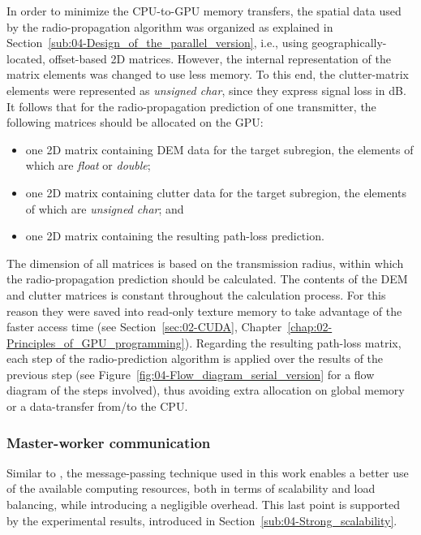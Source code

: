 In order to minimize the CPU-to-GPU memory transfers, the spatial
data used by the radio-propagation algorithm was organized as explained
in Section~\ref{sub:04-Design_of_the_parallel_version}, i.e., using
geographically-located, offset-based 2D matrices. However, the internal
representation of the matrix elements was changed to use less memory.
To this end, the clutter-matrix elements were represented as \emph{unsigned
char}, since they express signal loss in dB. It follows that for the
radio-propagation prediction of one transmitter, the following matrices
should be allocated on the GPU:
\begin{itemize}
\item one 2D matrix containing DEM data for the target subregion, the elements
of which are \emph{float} or \emph{double}; 
\item one 2D matrix containing clutter data for the target subregion, the
elements of which are \emph{unsigned char}; and
\item one 2D matrix containing the resulting path-loss prediction.
\end{itemize}
The dimension of all matrices is based on the transmission radius,
within which the radio-propagation prediction should be calculated.
The contents of the DEM and clutter matrices is constant throughout
the calculation process. For this reason they were saved into read-only
texture memory to take advantage of the faster access time (see Section~\ref{sec:02-CUDA},
Chapter~\ref{chap:02-Principles_of_GPU_programming}). Regarding
the resulting path-loss matrix, each step of the radio-prediction
algorithm is applied over the results of the previous step (see Figure~\ref{fig:04-Flow_diagram_serial_version}
for a flow diagram of the steps involved), thus avoiding extra allocation
on global memory or a data-transfer from/to the CPU.


\subsubsection{Master-worker communication}

Similar to \cite{Tabik-High_performance_three_horizon_composition_algorithm_for_large_scale_terrains:2011,Tabik-Optimal_tilt_and_orientation_maps_a_multi_algorithm_approach_for_heterogeneous_multicore_GPU_systems:2013},
the message-passing technique used in this work enables a better use
of the available computing resources, both in terms of scalability
and load balancing, while introducing a negligible overhead. This
last point is supported by the experimental results, introduced in
Section~\ref{sub:04-Strong_scalability}.

